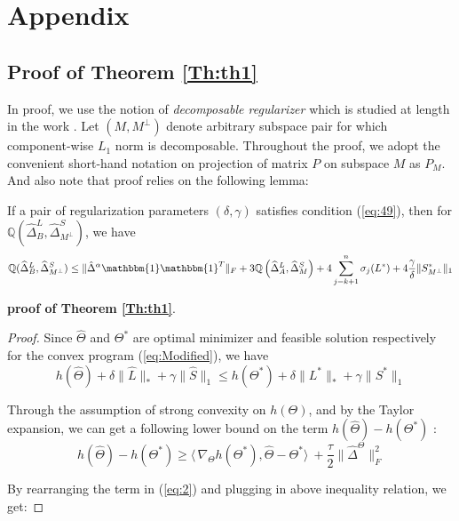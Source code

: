 \documentclass[AMS,STIX1COL]{WileyNJD-v2}
\begin{document}
{\section{Appendix}
\subsection{Proof of Theorem \ref{Th:th1}}

In proof, we use the notion of \emph{decomposable regularizer} which is studied at length in the work \cite{negahban2012unified}. Let $(M,M^{\perp})$ denote arbitrary subspace pair for which component-wise $L_{1}$ norm is decomposable. Throughout the proof, we adopt the convenient short-hand notation on projection of matrix $P$ on subspace $M$ as $P_{M}$. And also note that proof relies on the following lemma:

\begin{lemma} \label{le:le1}
If a pair of regularization parameters $(\delta,\gamma)$ satisfies condition (\ref{eq:49}), then for $\mathbb{Q}\left(\widehat{\Delta}^L_{B},\widehat{\Delta}^S_{M^\perp}\right)$, we have
\[
    \mathbb{Q}(\widehat{\Delta}^L_{B},\widehat{\Delta}^S_{M^\perp}) \leq
    \|\hat{\Delta}^{\alpha}\mathbbm{1}\mathbbm{1}^T\|_{F} +
    3\mathbb{Q}\left(\widehat{\Delta}^{L}_{A},\widehat{\Delta}^{S}_{M}\right)+4 \sum_{j=k+1}^{n} \sigma_{j}(L^{*}) + 4\frac{\gamma}{\delta}
    \|S^{*}_{M^\perp}\|_{1}
\]
\end{lemma}

\noindent\textbf{proof of Theorem \ref{Th:th1}}.
\begin{proof}
Since $\widehat{\Theta}$ and $\Theta^{*}$ are optimal minimizer and feasible solution respectively for the convex program (\ref{eq:Modified}), we have
\begin{equation}\label{eq:2}
    h(\widehat{\Theta}) + \delta\|\widehat{L}\|_{*} + \gamma\|\widehat{S}\|_{1} \leq
     h(\Theta^{*}) + \delta\|{L^{*}}\|_{*} + \gamma\|{S}^{*}\|_{1}
\end{equation}

Through the assumption of strong convexity on $h(\Theta)$, and by the Taylor expansion, we can get a following lower bound on the term $h(\widehat{\Theta})-h(\Theta^{*})$ :
\[
h(\widehat{\Theta})-h(\Theta^{*}) \geq
\langle\, \nabla_{\Theta}h(\Theta^{*}),\widehat{\Theta}-\Theta^{*}\rangle\ + \frac{\tau}{2}\|\widehat{\Delta}^{\Theta}\|_{F}^{2}
\]

By rearranging the term in (\ref{eq:2}) and plugging in above inequality relation, we get:


\end{proof}}
\end{document}
